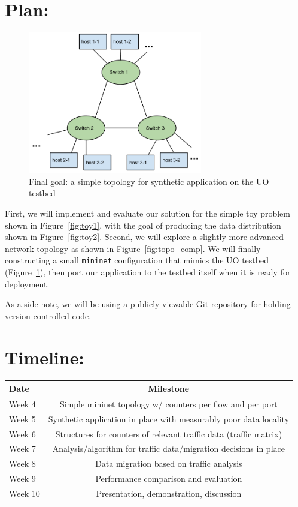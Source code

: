 \documentclass[12pt]{article} \usepackage{graphicx} \usepackage{amsmath}
\begin{document}
\section*{Plan:} \label{plan} 
\begin{figure}[t]
  \centerline{\includegraphics[width=3.0in]{img/topo.png}} 
  \caption{Final goal: a simple topology for synthetic application on the
  UO testbed} \label{fig:topo}
\end{figure} 
First, we will implement and evaluate our solution for the simple
toy problem shown in Figure~\ref{fig:toy1}, with the goal of producing the data
distribution shown in Figure~\ref{fig:toy2}.  Second, we will explore a slightly
more advanced network topology as shown in Figure~\ref{fig:topo_comp}.  We will
finally constructing a small \texttt{mininet} configuration that mimics the UO
testbed (Figure~\ref{fig:topo}), then port our application to the testbed itself
when it is ready for deployment.  

As a side note, we will be using a publicly viewable Git repository for holding
version controlled code.

\vspace{10mm}

\section*{Timeline:} \label{timeline} \begin{center} \begin{tabular}{ l || c }
\hline Date & Milestone \\ \hline \hline Week 4  & Simple mininet topology w/
counters per flow and per port \\ \hline Week 5  & Synthetic application in
place with measurably poor data locality \\ \hline Week 6  & Structures for
counters of relevant traffic data (traffic matrix) \\ \hline Week 7  &
Analysis/algorithm for traffic data/migration decisions in place \\ \hline Week
8  & Data migration based on traffic analysis \\ \hline Week 9  & Performance
comparison and evaluation \\ \hline Week 10 & Presentation, demonstration,
discussion \\ \hline \end{tabular} \end{center}
\end{document}
